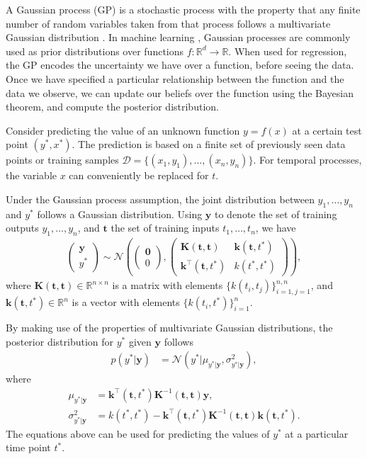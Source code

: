 \documentclass[journal]{IEEEtran}
\begin{document}
A Gaussian process (GP) is a stochastic process with the property that any finite number of random variables taken from that process follows a multivariate Gaussian distribution \cite{Rasmussen+Williams:2006, Shanmugan:randomSignals:88}. In machine learning \cite{Rasmussen+Williams:2006}, Gaussian processes are commonly used as prior distributions over functions $f: \mathbb{R}^d\rightarrow \mathbb{R}$. When used for regression, the GP encodes the uncertainty we have over a function, before seeing the data. Once we have specified a particular relationship between the function and the data we observe, we can update our beliefs over the function using the Bayesian theorem, and compute the posterior distribution.

Consider predicting the value of an unknown function $y = f(x)$ at a certain test point $(y^*, x^*)$. The prediction
is based on a finite set of previously seen data points or training samples
$\mathcal{D}=\{(x_1, y_1), \ldots, (x_n, y_n)\}$. For temporal processes, the variable $x$ can conveniently be
replaced for $t$.

Under the Gaussian process assumption, the joint distribution between $y_1, \ldots, y_n$ and $y^*$ follows a Gaussian
distribution. Using $\mathbf{y}$ to denote the set of training outputs $y_1, \ldots, y_n$, and $\mathbf{t}$ the set
of training inputs $t_1, \ldots, t_n$, we have
\begin{align*}
\begin{pmatrix}
\mathbf{y}\\
y^*
\end{pmatrix}\sim
\mathcal{N}
\left(
\begin{pmatrix}
\mathbf{0}\\
0
\end{pmatrix},
\begin{pmatrix}
\mathbf{K}(\mathbf{t}, \mathbf{t}) & \mathbf{k}(\mathbf{t}, t^*)\\
\mathbf{k}^{\top}(\mathbf{t}, t^*) & k(t^*, t^*)
\end{pmatrix}
\right),
\end{align*}
where $\mathbf{K}(\mathbf{t}, \mathbf{t})\in \mathbb{R}^{n\times n}$ is a matrix with elements
$\{k(t_i, t_j)\}_{i=1, j=1}^{n,n}$, and $\mathbf{k}(\mathbf{t}, t^*) \in \mathbb{R}^n$ is a vector with elements
$\{k(t_i, t^*)\}_{i=1}^n$.

By making use of the properties of multivariate Gaussian distributions, the posterior distribution for $y^*$ given
$\mathbf{y}$ follows
\begin{align*}
p(y^*|\mathbf{y}) & =\mathcal{N}(y^*|\mu_{y^*|\mathbf{y}}, \sigma^2_{y^*|\mathbf{y}}),
\end{align*}
where
\begin{align*}
\mu_{y^*|\mathbf{y}} & = \mathbf{k}^{\top}(\mathbf{t}, t^*)\mathbf{K}^{-1}(\mathbf{t}, \mathbf{t})\mathbf{y},\\
\sigma^2_{y^*|\mathbf{y}} & = k(t^*, t^*) - \mathbf{k}^{\top}(\mathbf{t}, t^*)\mathbf{K}^{-1}(\mathbf{t}, \mathbf{t})
\mathbf{k}(\mathbf{t}, t^*).
\end{align*}
The equations above can be used for predicting the values of $y^*$ at a particular time point $t^*$.
\end{document}

